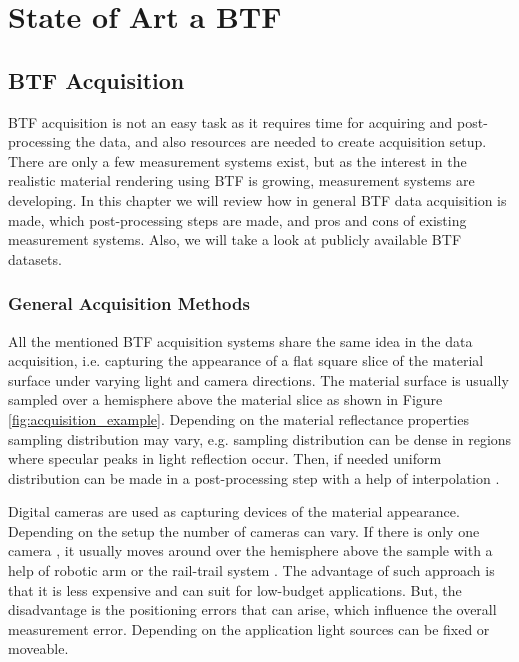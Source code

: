 \chapter{State of Art a BTF}
\label{chapter:stateOfArt}


\section{BTF Acquisition}
\label{chapter:acquisition}

BTF acquisition is not an easy task as it requires time for acquiring and post-processing the data, and also resources are needed to create acquisition setup.
There are only a few measurement systems \cite{star2004,schwartz,dana,Kaleidoscope,Koudelka,statistical_acq} exist, but as the interest in the realistic material rendering using BTF is growing, measurement systems are developing.
In this chapter we will review how in general BTF data acquisition is made, which post-processing steps are made, and pros and cons of existing measurement systems. 
Also, we will take a look at publicly available BTF datasets.

\subsection{General Acquisition Methods}
\label{section:General_acquisition}	
All the mentioned BTF acquisition systems share the same idea in the data acquisition, i.e. capturing the appearance of a flat square slice of the material surface under varying light and camera directions.
The material surface is usually sampled over a hemisphere above the material slice as shown in Figure \ref{fig:acquisition_example}.
Depending on the material reflectance properties sampling distribution may vary, e.g. sampling distribution can be dense in regions where specular peaks in light reflection occur. 
Then, if needed uniform distribution can be made in a post-processing step with a help of interpolation \cite{haindl_visual}.

Digital cameras are used as capturing devices of the material appearance. Depending on the setup the number of cameras can vary.
 If there is only one camera \cite{star2004,statistical_acq,dana}, it usually moves around over the hemisphere above the sample with a help of robotic arm or the rail-trail system \cite{star2004}. 
 The advantage of such approach is that it is less expensive and can suit for low-budget applications.
But, the disadvantage is the positioning errors that can arise, which influence the overall measurement error. 
Depending on the application light sources can be fixed or moveable.

